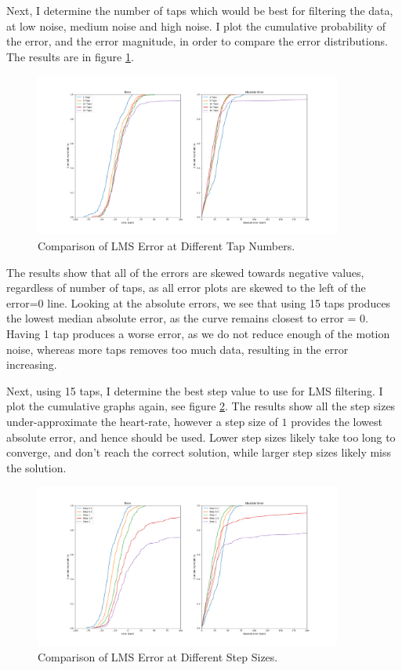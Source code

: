 \documentclass[12pt,a4paper,twoside,openany]{report}
\begin{document}
Next, I determine the number of taps which would be best for filtering the
data, at low noise, medium noise and high noise. I plot the cumulative
probability of the error, and the error magnitude, in order to compare
the error distributions. The results are in figure \ref{fig:lms-medium}.

\begin{figure}[tbh]
	\centerline{\includegraphics[width=0.9\textwidth]{figs/lms-taps-error-medium-noise.png}}
	\caption{Comparison of LMS Error at Different Tap Numbers.}
	\label{fig:lms-medium}
\end{figure}

The results show that all of the errors are skewed towards negative values,
regardless of number of taps, as all error plots are skewed to the left of the error=0
line. Looking at the absolute errors, we see that
using 15 taps produces the lowest median absolute error, as the curve remains
closest to error = 0. Having 1 tap produces a worse error, as we do not reduce
enough of the motion noise, whereas more taps removes too much data, resulting
in the error increasing.

Next, using 15 taps, I determine the best step value to use for LMS filtering.
I plot the cumulative graphs again, see figure \ref{fig:lms-medium-step}. The
results show all the step sizes under-approximate the heart-rate, however a
step size of $1$ provides the lowest absolute error, and hence should be used.
Lower step sizes likely take too long to converge, and don't reach the correct
solution, while larger step sizes likely miss the solution.

\begin{figure}[H]
	\centerline{\includegraphics[width=0.9\textwidth]{figs/lms-steps-error-medium-noise.png}}
	\caption{Comparison of LMS Error at Different Step Sizes.}
	\label{fig:lms-medium-step}
\end{figure}
\end{document}
